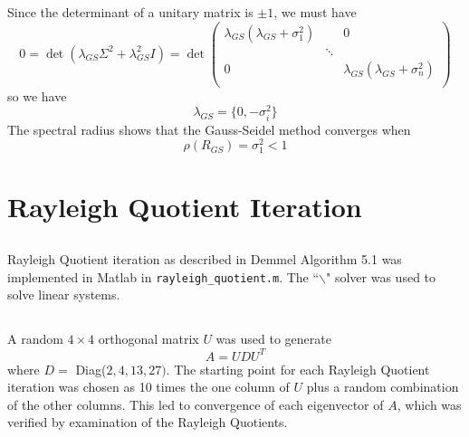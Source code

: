 \documentclass[11pt]{article} %
\begin{document}
Since the determinant of a unitary matrix is $\pm 1$, we must have
\begin{equation}
0=\det \left ( \lambda_{GS} \Sigma^2 + \lambda_{GS}^2 I \right )  = \det \left ( \begin{array}{rrr}
\lambda_{GS} (\lambda_{GS} + \sigma_1^2)  &&0 \\
& \ddots & \\
0&& \lambda_{GS} (\lambda_{GS} + \sigma_n^2) \\
\end{array} \right )
\end{equation}
so we have
\begin{equation}
\lambda_{GS} = \{ 0, -\sigma_i^2\}
\end{equation}
The spectral radius shows that the Gauss-Seidel method converges when
\begin{equation}
\boxed{\rho(R_{GS}) =\sigma_1^2 < 1}
\end{equation}
\section{Rayleigh Quotient Iteration}
\subsection{} %
Rayleigh Quotient iteration as described in Demmel Algorithm 5.1 was implemented in Matlab in \verb$rayleigh_quotient.m$. The ``$\backslash$" solver was used to solve linear systems.
\subsection{} %
A random $4\times4$ orthogonal matrix $U$ was used to generate
\begin{equation}
A = U DU^T
\end{equation}
where $D =$ Diag($2, 4, 13, 27)$.  The starting point for each Rayleigh Quotient iteration was chosen as 10 times the one column of $U$ plus a random combination of the other columns. This led to convergence of each eigenvector of $A$, which was verified by examination of the Rayleigh Quotients.
\end{document}
